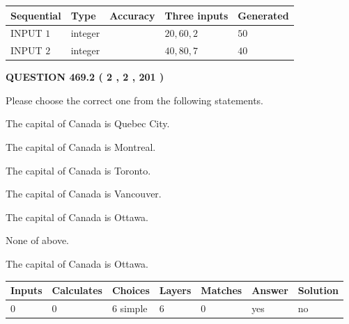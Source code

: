 \documentclass[12pt]{article}
\begin{document}
  
\noindent\begin{tabular}{|l|l|l|l|l|}
\hline
 Sequential & Type & Accuracy & Three inputs & Generated \\ 
\hline
 
 
  INPUT $  1 $ & integer &  & $
 20
 , 
 60
 , 
 2
 $ & $ 50 $ 
 \\  \hline  
 
 
  INPUT $  2 $ & integer &  & $
 40
 , 
 80
 , 
 7
 $ & $ 40 $ 
 \\  \hline  
 \end{tabular}
   
   
  
\vspace{0.2in}
  
{\textbf{\Large{QUESTION
469.2 
 ( 2 , 2 , 201 )
}}}
  
  
Please choose the correct one from the following statements.
 
 
The capital of Canada is Quebec City.
 
 
The capital of Canada is Montreal.
 
 
The capital of Canada is Toronto.
 
 
The capital of Canada is Vancouver.
 
 
The capital of Canada is Ottawa.
 
 
 None of above.
 
 
\noindent{}
 
 
The capital of Canada is Ottawa.
 
 
\noindent{}
 
 
   
   
   
   
\noindent\begin{tabular}{|l|l|l|l|l|l|l|}
 \hline
Inputs & Calculates & Choices & Layers & Matches & Answer & Solution \\ \hline
 0  & 
 0  & 
 6
  simple  
  & 
 6  & 
 0  & 
  yes & 
  no 
  \\ \hline
 \end{tabular}
   
   
   
\end{document}

